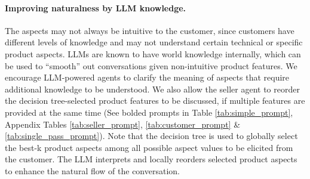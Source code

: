 \paragraph{Improving naturalness by LLM knowledge.}
The aspects may not always be intuitive to the customer, since customers have different levels of knowledge and may not understand certain technical or specific product aspects. LLMs are known to have world knowledge internally, which can be used to ``smooth'' out conversations given non-intuitive product features. We encourage LLM-powered agents to clarify the meaning of aspects that require additional knowledge to be understood. We also allow the seller agent to reorder the decision tree-selected product features to be discussed, if multiple features are provided at the same time (See bolded prompts in Table \ref{tab:simple_prompt}, Appendix Tables  \ref{tab:seller_prompt}, \ref{tab:customer_prompt} \& \ref{tab:single_pass_prompt}). Note that the decision tree is used to globally select the best-k product aspects among all possible aspect values to be elicited from the customer. The LLM interprets and locally reorders selected product aspects to enhance the natural flow of the conversation.


